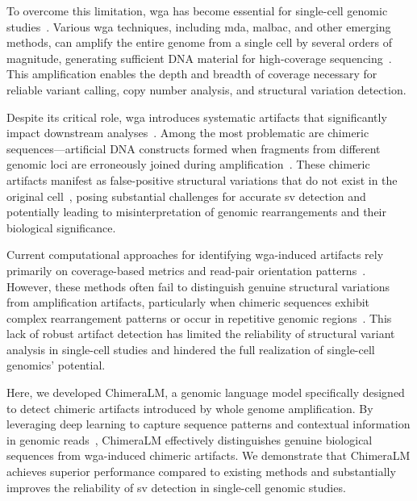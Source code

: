 \documentclass[pdflatex,sn-nature]{sn-jnl}%
\theoremstyle{thmstyleone}%
\theoremstyle{thmstyletwo}%
\theoremstyle{thmstylethree}%
\begin{document}
To overcome this limitation, \gls{wga} has become essential for single-cell genomic studies~\cite{zong2012genome, huang2015single}.
Various \gls{wga} techniques, including \gls{mda}, \gls{malbac}, and other emerging methods, can amplify the entire genome from a single cell by several orders of magnitude, generating sufficient DNA material for high-coverage sequencing~\cite{de2014quantitative, biezuner2021comparison,fu2015uniform, agyabeng2025evaluating}.
This amplification enables the depth and breadth of coverage necessary for reliable variant calling, copy number analysis, and structural variation detection.

Despite its critical role, \gls{wga} introduces systematic artifacts that significantly impact downstream analyses~\cite{lu2023chimera, lu2023exploration}.
Among the most problematic are chimeric sequences—artificial DNA constructs formed when fragments from different genomic loci are erroneously joined during amplification~\cite{lu2023chimera, lu2023exploration, agyabeng2025evaluating}.
These chimeric artifacts manifest as false-positive structural variations that do not exist in the original cell~\cite{lu2023chimera}, posing substantial challenges for accurate \gls{sv} detection and potentially leading to misinterpretation of genomic rearrangements and their biological significance.

Current computational approaches for identifying \gls{wga}-induced artifacts rely primarily on coverage-based metrics and read-pair orientation patterns~\cite{kiguchi2021long, lu2023exploration}.
However, these methods often fail to distinguish genuine structural variations from amplification artifacts, particularly when chimeric sequences exhibit complex rearrangement patterns or occur in repetitive genomic regions~\cite{kosugi2019comprehensive, mahmoud2019structural}.
This lack of robust artifact detection has limited the reliability of structural variant analysis in single-cell studies and hindered the full realization of single-cell genomics' potential.

Here, we developed ChimeraLM, a genomic language model specifically designed to detect chimeric artifacts introduced by whole genome amplification.
By leveraging deep learning to capture sequence patterns and contextual information in genomic reads~\cite{dalla2025nucleotide, zhou2023dnabert, nguyen2023hyenadna}, ChimeraLM effectively distinguishes genuine biological sequences from \gls{wga}-induced chimeric artifacts.
We demonstrate that ChimeraLM achieves superior performance compared to existing methods and substantially improves the reliability of \gls{sv} detection in single-cell genomic studies.
\end{document}
